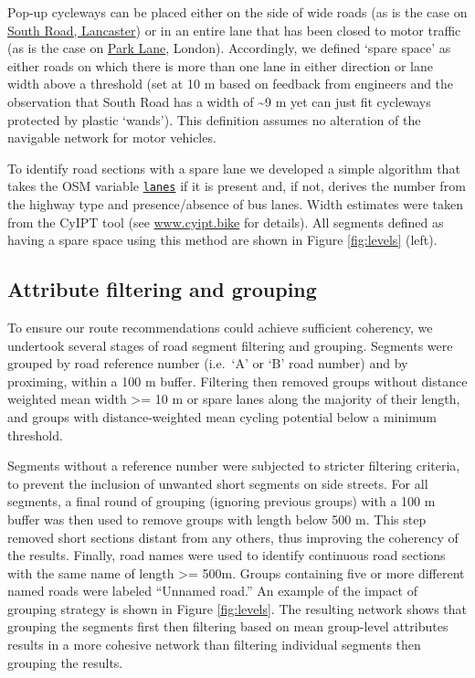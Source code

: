 \documentclass[
]{article}
\begin{document}
Pop-up cycleways can be placed either on the side of wide roads (as is the case on \href{https://www.lancasterguardian.co.uk/news/uk-news/mixed-reactions-new-lancaster-pop-cycle-lanes-busy-city-centre-road-2875909}{South Road, Lancaster}) or in an entire lane that has been closed to motor traffic (as is the case on \href{https://metro.co.uk/2020/05/14/road-turns-giant-cycle-lane-make-social-distancing-easier-12703847/}{Park Lane}, London).
Accordingly, we defined `spare space' as either roads on which there is more than one lane in either direction or lane width above a threshold (set at 10 m based on feedback from engineers and the observation that South Road has a width of \textasciitilde9 m yet can just fit cycleways protected by plastic `wands').
This definition assumes no alteration of the navigable network for motor vehicles.

To identify road sections with a spare lane we developed a simple algorithm that takes the OSM variable \href{https://wiki.openstreetmap.org/wiki/Key:lanes}{\texttt{lanes}} if it is present and, if not, derives the number from the highway type and presence/absence of bus lanes.
Width estimates were taken from the CyIPT tool (see \href{https://www.cyipt.bike/}{www.cyipt.bike} for details).
All segments defined as having a spare space using this method are shown in Figure \ref{fig:levels} (left).

\hypertarget{attribute-filtering-and-grouping}{%
\subsection{Attribute filtering and grouping}\label{attribute-filtering-and-grouping}}

To ensure our route recommendations could achieve sufficient coherency, we undertook several stages of road segment filtering and grouping.
Segments were grouped by road reference number (i.e.~`A' or `B' road number) and by proximing, within a 100 m buffer.
Filtering then removed groups without distance weighted mean width \textgreater= 10 m or spare lanes along the majority of their length, and groups with distance-weighted mean cycling potential below a minimum threshold.

Segments without a reference number were subjected to stricter filtering criteria, to prevent the inclusion of unwanted short segments on side streets.
For all segments, a final round of grouping (ignoring previous groups) with a 100 m buffer was then used to remove groups with length below 500 m.
This step removed short sections distant from any others, thus improving the coherency of the results.
Finally, road names were used to identify continuous road sections with the same name of length \textgreater= 500m.
Groups containing five or more different named roads were labeled ``Unnamed road.''
An example of the impact of grouping strategy is shown in Figure \ref{fig:levels}.
The resulting network shows that grouping the segments first then filtering based on mean group-level attributes results in a more cohesive network than filtering individual segments then grouping the results.
\end{document}
